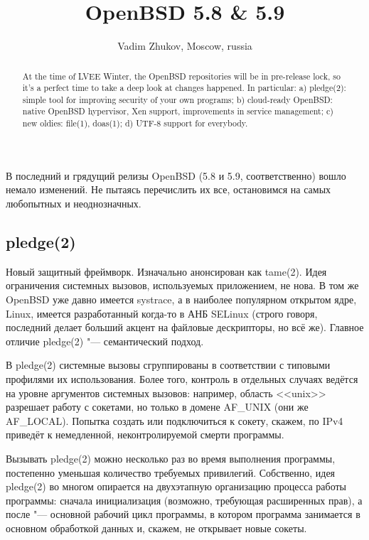 \documentclass[10pt, a5paper]{article}
\begin{document}
\title{OpenBSD 5.8 \& 5.9}
\author{Vadim Zhukov, Moscow, russia}
\maketitle
\begin{abstract}
At the time of LVEE Winter, the OpenBSD repositories will be in pre-release lock, so it's a perfect time to take a deep look at changes happened. In particular: a) pledge(2): simple tool for improving security of your own programs; b) cloud-ready OpenBSD: native OpenBSD hypervisor, Xen support, improvements in service management; c) new oldies: file(1), doas(1); d) UTF-8 support for everybody.
\end{abstract}

В последний и грядущий релизы OpenBSD (5.8 и 5.9, соответственно) вошло немало изменений. Не пытаясь перечислить их все, остановимся на самых любопытных и неоднозначных.

\subsection*{pledge(2)}

Новый защитный фреймворк. Изначально анонсирован как \linebreak tame(2). Идея ограничения системных вызовов, используемых приложением, не нова. В том же OpenBSD уже давно имеется systrace, а в наиболее популярном открытом ядре, Linux, имеется разработанный когда-то в АНБ SELinux (строго говоря, последний делает больший акцент на файловые дескрипторы, но всё же). Главное отличие pledge(2) "--- семантический подход.

В pledge(2) системные вызовы сгруппированы в соответствии с типовыми профилями их использования. Более того, контроль в отдельных случаях ведётся на уровне аргументов системных вызовов: например, область <<unix>> разрешает работу с сокетами, но только в домене AF\_UNIX (они же AF\_LOCAL). Попытка создать или подключиться к сокету, скажем, по IPv4 приведёт к немедленной, неконтролируемой смерти программы.

Вызывать pledge(2) можно несколько раз во время выполнения программы, постепенно уменьшая количество требуемых привилегий. Собственно, идея pledge(2) во многом опирается на двухэтапную организацию процесса работы программы: сначала инициализация (возможно, требующая расширенных прав), а после "--- основной рабочий цикл программы, в котором программа занимается в основном обработкой данных и, скажем, не открывает новые сокеты.
\end{document}
